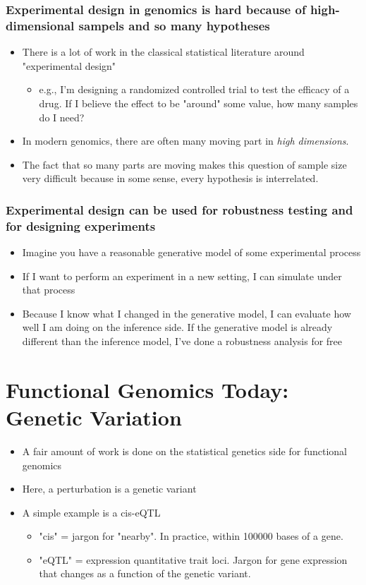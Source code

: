 \documentclass[10pt]{article}
\begin{document}
\subsubsection*{Experimental design in genomics is hard because of high-dimensional sampels and so many hypotheses}
\begin{itemize}
    \item There is a lot of work in the classical statistical literature around "experimental design"
    \begin{itemize}
        \item e.g., I'm designing a randomized controlled trial to test the efficacy of a drug.  If I believe the effect to be "around" some value, how many samples do I need?
    \end{itemize}
    \item In modern genomics, there are often many moving part in \textit{high dimensions}.
    \item The fact that so many parts are moving makes this question of sample size very difficult because in some sense, every hypothesis is interrelated.
\end{itemize}
\subsubsection*{Experimental design can be used for robustness testing and for designing experiments}
\begin{itemize}
    \item Imagine you have a reasonable generative model of some experimental process
    \item If I want to perform an experiment in a new setting, I can simulate under that process
    \item Because I know what I changed in the generative model, I can evaluate how well I am doing on the inference side.  If the generative model is already different than the inference model, I've done a robustness analysis for free
\end{itemize}

\section*{Functional Genomics Today: Genetic Variation}
\begin{itemize}
    \item A fair amount of work is done on the statistical genetics side for functional genomics
    \item Here, a perturbation is a genetic variant
    \item A simple example is a cis-eQTL
    \begin{itemize}
        \item "cis" = jargon for "nearby".  In practice, within 100000 bases of a gene.
        \item "eQTL" = expression quantitative trait loci.  Jargon for gene expression that changes as a function of the genetic variant.
    \end{itemize}
\end{itemize}
\end{document}
